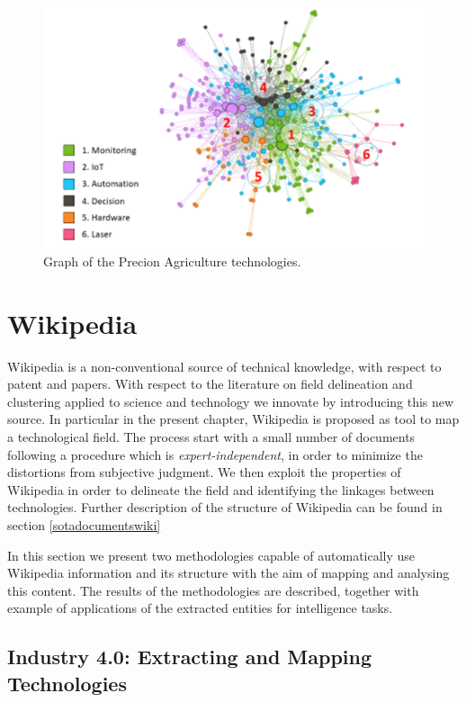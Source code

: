 \documentclass[b5paper,]{book}
\theoremstyle{definition}
\theoremstyle{definition}
\theoremstyle{definition}
\theoremstyle{remark}
\begin{document}
\begin{figure}

{\centering \includegraphics[width=0.8\linewidth]{_bookdown_files/figures/precisiongraph} 

}

\caption{Graph of the Precion Agriculture technologies.}\label{fig:precisiongraph}
\end{figure}

\chapter{Wikipedia}\label{wikipedia}

Wikipedia is a non-conventional source of technical knowledge, with
respect to patent and papers. With respect to the literature on field
delineation and clustering applied to science and technology we innovate
by introducing this new source. In particular in the present chapter,
Wikipedia is proposed as tool to map a technological field. The process
start with a small number of documents following a procedure which is
\emph{expert-independent}, in order to minimize the distortions from
subjective judgment. We then exploit the properties of Wikipedia in
order to delineate the field and identifying the linkages between
technologies. Further description of the structure of Wikipedia can be
found in section \ref{sotadocumentswiki}

In this section we present two methodologies capable of automatically
use Wikipedia information and its structure with the aim of mapping and
analysing this content. The results of the methodologies are described,
together with example of applications of the extracted entities for
intelligence tasks.

\section{Industry 4.0: Extracting and Mapping
Technologies}\label{technimetrochap}
\end{document}
